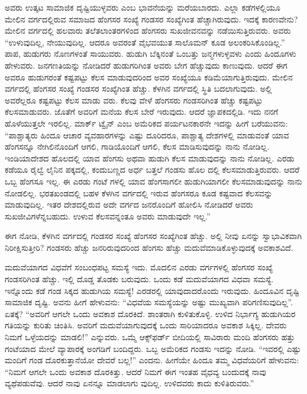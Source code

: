 ಅವರು ಉತ್ಕಟ ಸಾಮಾಜಿಕ ದೃಷ್ಟಿಯುಳ್ಳವರು ಎಂಬ ಭಾವನೆಯನ್ನು ಮರೆಯಬಾರದು. ಎಲ್ಲಾ ಕಡೆಗಳಲ್ಲಿಯೂ ಮೇಲಿನ ವರ್ಗದಲ್ಲಿರುವ ಸಮಾಜದ ಹೆಂಗಸರ ಸಂಖ್ಯೆ ಗಂಡಸರ ಸಂಖ್ಯೆಗಿಂತ ಹೆಚ್ಚಾಗಿರುವುದು. ಇದಕ್ಕೆ ಕಾರಣವೇನು? ಮೇಲಿನ ವರ್ಗದಲ್ಲಿ ಹಲವಾರು ತಲೆತಲಾಂತರಗಳಿಂದ ಹೆಂಗಸರು ಸುಖಜೀವನವನ್ನು ನಡೆಯಿಸುತ್ತಿರುವರು. ಅವರು “ಉಳುವುದಿಲ್ಲ, ನೇಯುವುದಿಲ್ಲ. ಆದರೂ ಅವರಂತೆ ವೈಭವಯುತ ಸಾಲೊಮನ್​ ಕೂಡ ಅಲಂಕರಿಸಿಕೊಂಡಿಲ್ಲ.” ಪಾಪ, ಹುಡುಗರು ನೊಣಗಳಂತೆ ಸಾಯುವರು. ಹುಡುಗಿ ಬೆಕ್ಕಿನಂತೆ ಒಂಬತ್ತು ಜನ್ಮಗಳುಳ್ಳವಳು ಎಂದು ಹಿಂದೂಗಳು ಹೇಳುವರು. ಜನಗಣತಿಯನ್ನು ನೋಡಿದರೆ ಹುಡುಗರಿಗಿಂತ ಅವರು ಬೇಗ ಹೆಚ್ಚುವುದು ಕಾಣುವುದು. ಆದರೆ ಈಗ ಅವರೂ ಹುಡುಗರಂತೆ ಕಷ್ಟಪಟ್ಟು ಕೆಲಸ ಮಾಡುವುದರಿಂದ ಅವರ ಸಂಖ್ಯೆಯೂ ಕಡಿಮೆಯಾಗುತ್ತಿರುವುದು. ಮೇಲಿನ ವರ್ಗದಲ್ಲಿ ಹೆಂಗಸರ ಸಂಖ್ಯೆ ಗಂಡಸರ ಸಂಖ್ಯೆಗಿಂತ ಹೆಚ್ಚು. ಕೆಳಗಿನ ವರ್ಗದಲ್ಲಿ ಸ್ಥಿತಿ ಬದಲಾಗುವುದು. ಅಲ್ಲಿ ಅವರೆಲ್ಲರೂ ಕಷ್ಟಪಟ್ಟು ಕೆಲಸ ಮಾಡು ವರು. ಕೆಲವು ವೇಳೆ ಹೆಂಗಸರು ಗಂಡಸರಿಗಿಂತ ಹೆಚ್ಚು ಕಷ್ಟಪಟ್ಟು ಕೆಲಸಮಾಡುವರು. ಜೊತೆಗೆ ಅವರಿಗೆ ಮನೆಯ ಕೆಲಸ ಬೇರೆ ಇರುವುದು. ಆದರೆ ಜ್ಞಾಪಕದಲ್ಲಿಡಿ. ಇದು ನನಗೆ ಹೊಳೆಯುತ್ತಲೇ ಇರಲಿಲ್ಲ. ಮಾರ್ಕ್​ ಟ್ವೈನ್​ ಎಂಬ ಅಮೆರಿಕದ ಪರ್ಯಟನಕಾರನೇ ಇದನ್ನು ಹೀಗೆ ಬರೆಯುವನು: “ಪಾಶ್ಚಾತ್ಯರು ಹಿಂದೂ ಆಚಾರ ವ್ಯವಹಾರಗಳನ್ನು ಎಷ್ಟು ದೂರಿದರೂ, ಪಾಶ್ಚಾತ್ಯ ದೇಶಗಳಲ್ಲಿ ಮಾಡುವಂತೆ ಯಾವ ಹೆಂಗಸನ್ನೂ ನೇಗಿಲಿನೊಂದಿಗೆ ಆಗಲಿ, ಗಾಡಿಯೊಂದಿಗೆ ಆಗಲಿ, ಕೆಲಸ ಮಾಡಿಸುವುದನ್ನು ನಾನು ನೋಡಿಲ್ಲ. ಇಂಡಿಯಾದೇಶದ ಹೊಲದಲ್ಲಿ ಯಾವ ಹೆಂಗಸು ಅಥವಾ ಹುಡುಗಿ ಕೆಲಸ ಮಾಡುವುದನ್ನು ನಾನು ನೋಡಿಲ್ಲ. ಎರಡು ಕಡೆಯೂ ರೈಲ್ವೆ ಲೈನಿನ ಪಕ್ಕದಲ್ಲಿ, ಕಂದುಬಣ್ಣದ ಅರ್ಧ ಬತ್ತಲೆ ಗಂಡಸು ಹೊಲ ದಲ್ಲಿ ಕೆಲಸಮಾಡುತ್ತಿರುವರು. ಆದರೆ ಒಬ್ಬ ಹೆಂಗಸೂ ಇಲ್ಲ. ಈ ಎರಡು ಗಂಟೆ ಗಳಲ್ಲಿ ಯಾವ ಹೆಂಗಸಾಗಲೀ ಹುಡುಗಿಯಾಗಲೀ ಕೆಲಸಮಾಡುವುದನ್ನು ನಾನು ನೋಡಲಿಲ್ಲ. ಭರತಖಂಡದಲ್ಲಿ ಬಹಳ ಕೆಳಗಿನ ವರ್ಗದಲ್ಲಿ ಇರುವ ಹೆಂಗಸರೂ ಕೂಡ ಕಷ್ಟವಾದ ಕೆಲಸವನ್ನು ಮಾಡುವುದಿಲ್ಲ. ಇತರ ದೇಶದಲ್ಲಿರುವ ಅದೇ ವರ್ಗದ ಜನರೊಂದಿಗೆ ಹೋಲಿಸಿ ನೋಡಿದರೆ ಅವರು ಸುಖಜೀವಿಗಳೆನ್ನಬಹುದು. ಉಳುವ ಕೆಲಸವನ್ನಂತೂ ಅವರು ಮಾಡುವುದೇ ಇಲ್ಲ.”

ಈಗ ನೋಡಿ, ಕೆಳಗಿನ ವರ್ಗದಲ್ಲಿ ಗಂಡಸರ ಸಂಖ್ಯೆ ಹೆಂಗಸರ ಸಂಖ್ಯೆಗಿಂತ ಹೆಚ್ಚು. ಅಲ್ಲಿ ನೀವು ಏನನ್ನು ಸ್ವಾಭಾವಿಕವಾಗಿ ನಿರೀಕ್ಷಿಸುತ್ತೀರಿ? ಗಂಡಸರು ಹೆಚ್ಚು ಜನರಿರುವುದರಿಂದ ಹೆಂಗಸು ಹೆಚ್ಚು ಮದುವೆಮಾಡಿಕೊಳ್ಳುವುದಕ್ಕೆ ಅವಕಾಶವಿದೆ.

ಮದುವೆಯಾಗದ ವಿಧವೆಗೆ ಸಂಬಂಧಪಟ್ಟ ಸಮಸ್ಯೆ ಇದು. ಮೊದಲಿನ ಎರಡು ವರ್ಗಗಳಲ್ಲಿ ಹೆಂಗಸರ ಸಂಖ್ಯೆ ಗಂಡಸರಿಗಿಂತ ಹೆಚ್ಚು. ಇಲ್ಲಿ ದೊಡ್ಡ ತೊಡಕು ಬರುವುದು. ಒಂದು ಕಡೆ ಮದುವೆಯಾಗದ ವಿಧವಾ ಸಮಸ್ಯೆ. ಇನ್ನೊಂದು ಕಡೆ ಗಂಡ ಸಿಕ್ಕದ ಹುಡುಗಿಯ ಸಮಸ್ಯೆ! ಎರಡರಲ್ಲಿ ಯಾವುದಾದರೊಂದು ಇರುವುದು. ಹಿಂದೂವಿನ ದೃಷ್ಟಿ ಸಾಮಾಜಿಕ ದೃಷ್ಟಿ. ಅವನು ಹೀಗೆ ಹೇಳುವನು: “ವಿಧವೆಯ ಸಮಸ್ಯೆಯನ್ನು ಅಷ್ಟು ಮುಖ್ಯವಾಗಿ ಪರಿಗಣಿಸುವುದಿಲ್ಲ”. ಏತಕ್ಕೆ? “ಅವರಿಗೆ ಆಗಲೇ ಒಂದು ಅವಕಾಶ ದೊರಕಿದೆ. ಶಾಂತರಾಗಿ ಕುಳಿತುಕೊಳ್ಳಿ. ಉಳಿದ ನಿರ್ಭಾಗ್ಯ ಹುಡುಗಿಯರ ಗತಿಯನ್ನು ಕುರಿತು ಚಿಂತಿಸಿ. ಅವರಿಗೆ ಮದುವೆಯಾಗುವುದಕ್ಕೆ ಒಂದು ಸಾರಿಯಾದರೂ ಅವಕಾಶ ಸಿಕ್ಕಿಲ್ಲ. ದೇವರು ನಿಮಗೆ ಒಳ್ಳೆಯದನ್ನು ಮಾಡಲಿ!” ಎನ್ನುವರು. ಒಮ್ಮೆ ಆಕ್ಸ್​ಫರ್ಡ್​ ಬೀದಿಯಲ್ಲಿ ಸಾವಿರಾರು ಮಂದಿ ಹೆಂಗಸರು ಹತ್ತು ಗಂಟೆಯಾದ ಮೇಲೆ ವ್ಯಾಪಾರಕ್ಕೆ ಅಂಗಡಿಗೆ ಬಂದಿದ್ದರು. ಒಬ್ಬ ಅಮೆರಿಕದ ಗಂಡಸು ಇದನ್ನು ನೋಡಿ. “ಇವರಲ್ಲಿ ಎಷ್ಟು ಮಂದಿಗೆ ಗಂಡ ದೊರಕುತ್ತಾನೆಯೋ ದೇವರೆ ಬಲ್ಲ!” ಎಂದನು. ಹೀಗೆಯೇ ಹಿಂದೂ ತಮ್ಮ ವಿಧವೆಯರಿಗೆ ಹೇಳುವನು: “ನಿಮಗೆ ಆಗಲೇ ಒಂದು ಅವಕಾಶ ದೊರಕಿತ್ತು. ಆದರೆ ನಿಮಗೆ ಈಗ ಇಂತಹ ವೈಧವ್ಯ ಬಂದುದಕ್ಕೆ ನಾವು ವ್ಯಥೆಪಡುವೆವು. ಆದರೆ ನಾವು ಏನನ್ನೂ ಮಾಡಲಾಗು ವುದಿಲ್ಲ. ಉಳಿದವರು ಕಾದು ಕುಳಿತಿರುವರು.”

